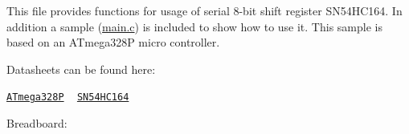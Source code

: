This file provides functions for usage of serial 8-\/bit shift register S\+N54\+H\+C164. In addition a sample (\hyperlink{main_8c}{main.\+c}) is included to show how to use it. This sample is based on an A\+Tmega328\+P micro controller.

Datasheets can be found here\+:

\href{../datasheets/Atmel-42735-8-bit-AVR-Microcontroller-ATmega328-328P_Datasheet.pdf}{\tt A\+Tmega328\+P} ~\newline
 \href{../datasheets/164445-da-01-en-CMOS_IC_SN74HC164N_DIP14_TID.pdf}{\tt S\+N54\+H\+C164}

Breadboard\+: \begin{center}\end{center}  
